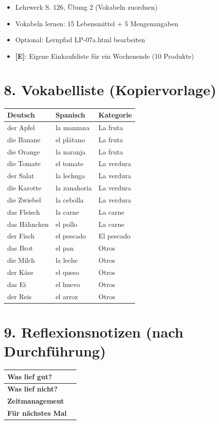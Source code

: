 \documentclass[11pt, a4paper]{article}
\newcommand{\E}{\textcolor{erweiterung}{\textbf{[E]}}}
\begin{document}
\begin{itemize}
    \item Lehrwerk S. 126, Übung 2 (Vokabeln zuordnen)
    \item Vokabeln lernen: 15 Lebensmittel + 5 Mengenangaben
    \item Optional: Lernpfad LP-07a.html bearbeiten
    \item \E{}: Eigene Einkaufsliste für ein Wochenende (10 Produkte)
\end{itemize}


\section*{8. Vokabelliste (Kopiervorlage)}

\begin{tabular}{|l|l|l|}
\hline
\textbf{Deutsch} & \textbf{Spanisch} & \textbf{Kategorie} \\
\hline
der Apfel & la manzana & La fruta \\
die Banane & el plátano & La fruta \\
die Orange & la naranja & La fruta \\
\hline
die Tomate & el tomate & La verdura \\
der Salat & la lechuga & La verdura \\
die Karotte & la zanahoria & La verdura \\
die Zwiebel & la cebolla & La verdura \\
\hline
das Fleisch & la carne & La carne \\
das Hähnchen & el pollo & La carne \\
der Fisch & el pescado & El pescado \\
\hline
das Brot & el pan & Otros \\
die Milch & la leche & Otros \\
der Käse & el queso & Otros \\
das Ei & el huevo & Otros \\
der Reis & el arroz & Otros \\
\hline
\end{tabular}


\section*{9. Reflexionsnotizen (nach Durchführung)}

\begin{tabularx}{\textwidth}{|l|X|}
\hline
\textbf{Was lief gut?} & \\[2em]
\hline
\textbf{Was lief nicht?} & \\[2em]
\hline
\textbf{Zeitmanagement} & \\[2em]
\hline
\textbf{Für nächstes Mal} & \\[2em]
\hline
\end{tabularx}
\end{document}
